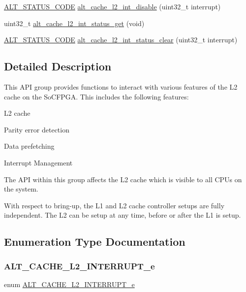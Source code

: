 \begin{DoxyCompactItemize}
\item 
\mbox{\hyperlink{hwlib_8h_abdb0d369f069723ca55d6c94bcaaaa12}{A\+L\+T\+\_\+\+S\+T\+A\+T\+U\+S\+\_\+\+C\+O\+DE}} \mbox{\hyperlink{group__CACHE__L2_gae4a0dd36f01ceeb9fb59b226f97fcee7}{alt\+\_\+cache\+\_\+l2\+\_\+int\+\_\+disable}} (uint32\+\_\+t interrupt)
\item 
uint32\+\_\+t \mbox{\hyperlink{group__CACHE__L2_ga2de7e9de23c2269431442082abdcf44e}{alt\+\_\+cache\+\_\+l2\+\_\+int\+\_\+status\+\_\+get}} (void)
\item 
\mbox{\hyperlink{hwlib_8h_abdb0d369f069723ca55d6c94bcaaaa12}{A\+L\+T\+\_\+\+S\+T\+A\+T\+U\+S\+\_\+\+C\+O\+DE}} \mbox{\hyperlink{group__CACHE__L2_gac5f93b2bfd3a80f19e24e196164d13d4}{alt\+\_\+cache\+\_\+l2\+\_\+int\+\_\+status\+\_\+clear}} (uint32\+\_\+t interrupt)
\end{DoxyCompactItemize}


\subsection{Detailed Description}
This A\+PI group provides functions to interact with various features of the L2 cache on the So\+C\+F\+P\+GA. This includes the following features\+:
\begin{DoxyItemize}
\item L2 cache
\item Parity error detection
\item Data prefetching
\item Interrupt Management
\end{DoxyItemize}

The A\+PI within this group affects the L2 cache which is visible to all C\+P\+Us on the system.

With respect to bring-\/up, the L1 and L2 cache controller setups are fully independent. The L2 can be setup at any time, before or after the L1 is setup. 

\subsection{Enumeration Type Documentation}
\mbox{\label{group__CACHE__L2_ga84becd73f55dba868c78e0304d27ea39}} 
\subsubsection{\texorpdfstring{ALT\_CACHE\_L2\_INTERRUPT\_e}{ALT\_CACHE\_L2\_INTERRUPT\_e}}
{\footnotesize\ttfamily enum \mbox{\hyperlink{group__CACHE__L2_ga84becd73f55dba868c78e0304d27ea39}{A\+L\+T\+\_\+\+C\+A\+C\+H\+E\+\_\+\+L2\+\_\+\+I\+N\+T\+E\+R\+R\+U\+P\+T\+\_\+e}}}

